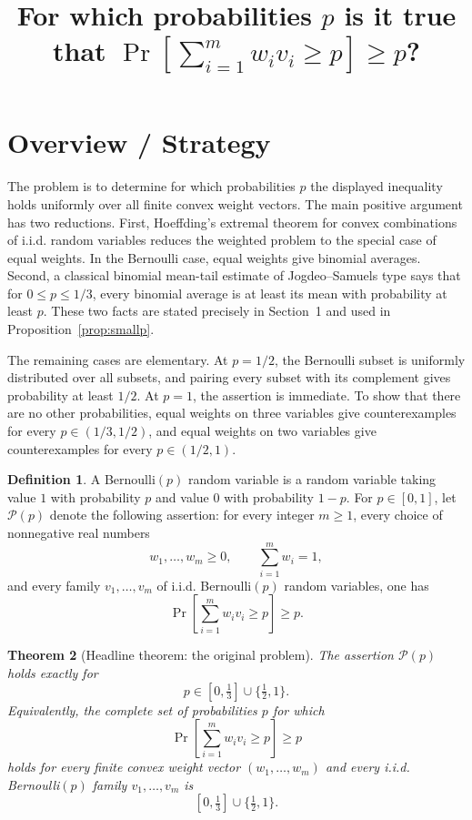 \documentclass[12pt]{article}
\title{For which probabilities \(p\) is it true that
\(\Pr\!\left[\sum_{i=1}^{m} w_i v_i \ge p\right]\ge p\)?}
\author{}
\date{}
\theoremstyle{definition}
\newtheorem{definition}{Definition}
\theoremstyle{plain}
\newtheorem{theorem}[definition]{Theorem}
\theoremstyle{remark}
\begin{document}
\maketitle

\section*{Overview / Strategy}

The problem is to determine for which probabilities \(p\) the displayed inequality holds uniformly over all finite convex weight vectors. The main positive argument has two reductions. First, Hoeffding's extremal theorem for convex combinations of i.i.d. random variables reduces the weighted problem to the special case of equal weights. In the Bernoulli case, equal weights give binomial averages. Second, a classical binomial mean-tail estimate of Jogdeo--Samuels type says that for \(0\le p\le 1/3\), every binomial average is at least its mean with probability at least \(p\). These two facts are stated precisely in Section~1 and used in Proposition~\ref{prop:smallp}.

The remaining cases are elementary. At \(p=1/2\), the Bernoulli subset is uniformly distributed over all subsets, and pairing every subset with its complement gives probability at least \(1/2\). At \(p=1\), the assertion is immediate. To show that there are no other probabilities, equal weights on three variables give counterexamples for every \(p\in(1/3,1/2)\), and equal weights on two variables give counterexamples for every \(p\in(1/2,1)\).

\begin{definition}
A Bernoulli\((p)\) random variable is a random variable taking value \(1\) with probability \(p\) and value \(0\) with probability \(1-p\). For \(p\in[0,1]\), let \(\mathcal P(p)\) denote the following assertion:
for every integer \(m\ge1\), every choice of nonnegative real numbers
\[
w_1,\ldots,w_m\ge0,\qquad \sum_{i=1}^{m}w_i=1,
\]
and every family \(v_1,\ldots,v_m\) of i.i.d. Bernoulli\((p)\) random variables, one has
\[
\Pr\!\left[\sum_{i=1}^{m}w_i v_i\ge p\right]\ge p.
\]
\end{definition}

\begin{theorem}[Headline theorem: the original problem]\label{thm:main}
The assertion \(\mathcal P(p)\) holds exactly for
\[
p\in[0,\tfrac13]\cup\{\tfrac12,1\}.
\]
Equivalently, the complete set of probabilities \(p\) for which
\[
\Pr\!\left[\sum_{i=1}^{m} w_i v_i\ge p\right]\ge p
\]
holds for every finite convex weight vector \((w_1,\ldots,w_m)\) and every i.i.d. Bernoulli\((p)\) family \(v_1,\ldots,v_m\) is
\[
\boxed{[0,\tfrac13]\cup\{\tfrac12,1\}}.
\]
\end{theorem}
\end{document}
